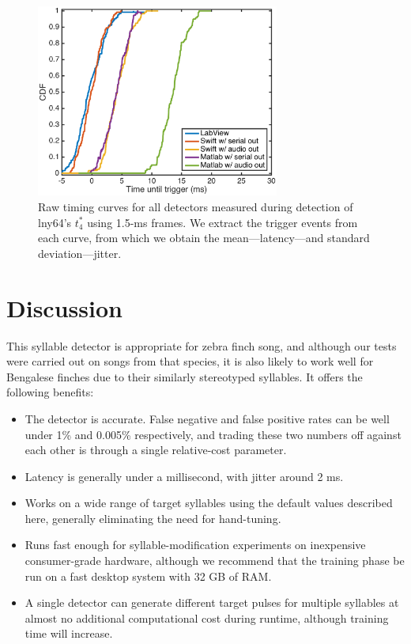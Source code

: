 \documentclass[10pt,letterpaper]{article}
\begin{document}
\begin{figure}
  \begin{center}
    \includegraphics[width=8cm]{Fig7}
  \end{center}
  \caption{Raw timing curves for all detectors measured during
    detection of lny64's $t^*_4$ using 1.5-ms frames.  We extract the trigger events from each curve, from which we obtain the mean---latency---and
    standard deviation---jitter.}
  \label{fig:timing}
\end{figure}


\section{Discussion}
\label{sec:conclusion}

This syllable detector is appropriate for zebra finch song, and
although our tests were carried out on songs from that species, it is
also likely to work well for Bengalese finches due to their similarly stereotyped syllables.  It offers the
following benefits:
\begin{itemize}
\item The detector is accurate. False negative and false positive
  rates can be well under 1\% and 0.005\% respectively, and trading
  these two numbers off against each other is through a single
  relative-cost parameter.
\item Latency is generally under a millisecond, with jitter around 2
  ms.
\item Works on a wide range of target syllables using the default
  values described here, generally eliminating the need for
  hand-tuning.
\item Runs fast enough for syllable-modification experiments on
  inexpensive consumer-grade hardware, although we recommend that the
  training phase be run on a fast desktop system with 32 GB of RAM.
\item A single detector can generate different target pulses for
  multiple syllables at almost no additional computational cost during
  runtime, although training time will increase.
\end{itemize}
\end{document}
